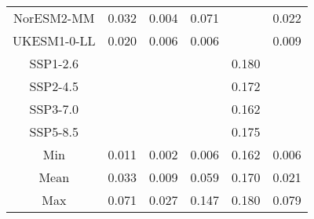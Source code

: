 \begin{table*}[t]
\begin{tabular}{c|rrr|rr}
NorESM2-MM & 0.032 & 0.004 & 0.071 &  & 0.022 \\
UKESM1-0-LL & 0.020 & 0.006 & 0.006 &  & 0.009 \\
SSP1-2.6 &  &  &  & 0.180 &  \\
SSP2-4.5 &  &  &  & 0.172 &  \\
SSP3-7.0 &  &  &  & 0.162 &  \\
SSP5-8.5 &  &  &  & 0.175 &  \\
\midrule
Min & 0.011 & 0.002 & 0.006 & 0.162 & 0.006 \\
Mean & 0.033 & 0.009 & 0.059 & 0.170 & 0.021 \\
Max & 0.071 & 0.027 & 0.147 & 0.180 & 0.079 \\
\bottomrule
\end{tabular}
\end{table*}
